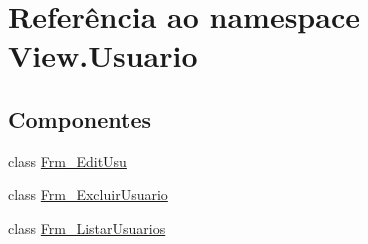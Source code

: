 \hypertarget{namespace_view_1_1_usuario}{}\section{Referência ao namespace View.\+Usuario}
\label{namespace_view_1_1_usuario}
\subsection*{Componentes}
\begin{DoxyCompactItemize}
\item 
class \hyperlink{class_view_1_1_usuario_1_1_frm___edit_usu}{Frm\+\_\+\+Edit\+Usu}
\item 
class \hyperlink{class_view_1_1_usuario_1_1_frm___excluir_usuario}{Frm\+\_\+\+Excluir\+Usuario}
\item 
class \hyperlink{class_view_1_1_usuario_1_1_frm___listar_usuarios}{Frm\+\_\+\+Listar\+Usuarios}
\end{DoxyCompactItemize}
